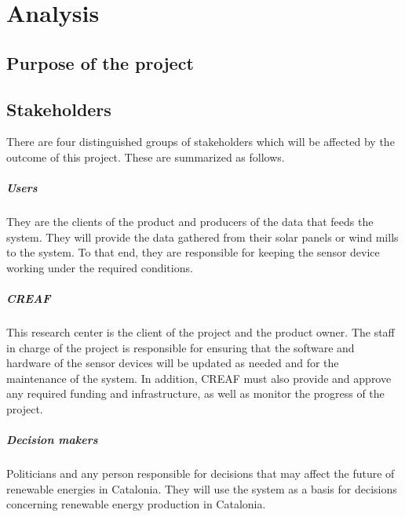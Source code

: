 \chapter{Analysis}

\section{Purpose of the project}
\section{Stakeholders}

There are four distinguished groups of stakeholders which will be affected by the outcome of this project. These are summarized as follows.

\paragraph{Users} They are the clients of the product and producers of the data that feeds the system. They will provide the data gathered from their solar panels or wind mills to the system. To that end, they are responsible for keeping the sensor device working under the required conditions.
\paragraph{CREAF} This research center is the client of the project and the product owner. The staff in charge of the project is responsible for ensuring that the software and hardware of the sensor devices will be updated as needed and for the maintenance of the system. In addition, CREAF must also provide and approve any required funding and infrastructure, as well as monitor the progress of the project.
\paragraph{Decision makers} Politicians and any person responsible for decisions that may affect the future of renewable energies in Catalonia. They will use the system as a basis for decisions concerning renewable energy production in Catalonia.
